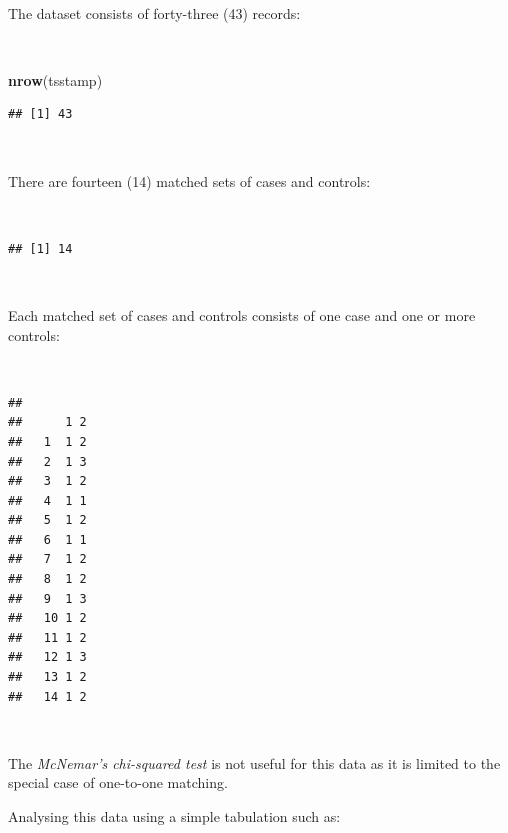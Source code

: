 \documentclass[12pt,a4paper]{book}
\newenvironment{Shaded}{\begin{snugshade}}{\end{snugshade}}
\newcommand{\KeywordTok}[1]{\textcolor[rgb]{0.13,0.29,0.53}{\textbf{#1}}}
\newcommand{\OperatorTok}[1]{\textcolor[rgb]{0.81,0.36,0.00}{\textbf{#1}}}
\newcommand{\NormalTok}[1]{#1}
\theoremstyle{definition}
\theoremstyle{definition}
\theoremstyle{definition}
\theoremstyle{remark}
\begin{document}
~

The dataset consists of forty-three (43) records:

~

\begin{Shaded}
\begin{Highlighting}[]
\KeywordTok{nrow}\NormalTok{(tsstamp)}
\end{Highlighting}
\end{Shaded}

\begin{verbatim}
## [1] 43
\end{verbatim}

~

There are fourteen (14) matched sets of cases and controls:

~

\begin{Shaded}
\end{Shaded}

\begin{verbatim}
## [1] 14
\end{verbatim}

~

Each matched set of cases and controls consists of one case and one or
more controls:

~

\begin{Shaded}
\end{Shaded}

\begin{verbatim}
##     
##      1 2
##   1  1 2
##   2  1 3
##   3  1 2
##   4  1 1
##   5  1 2
##   6  1 1
##   7  1 2
##   8  1 2
##   9  1 3
##   10 1 2
##   11 1 2
##   12 1 3
##   13 1 2
##   14 1 2
\end{verbatim}

~

The \emph{McNemar's chi-squared test} is not useful for this data as it
is limited to the special case of one-to-one matching.

Analysing this data using a simple tabulation such as:
\end{document}
